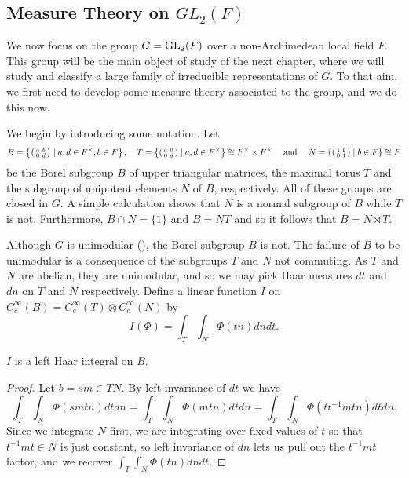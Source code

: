 \subsection{Measure Theory on \texorpdfstring{$GL_2(F)$}{TEXT}}\label{sec:measuregl2}

We now focus on the group $G=\mathrm{GL}_2(F)$ over a non-Archimedean local field $F$. This group will be the main object of study of the next chapter, where we will study and classify a large family of irreducible representations of $G$. To that aim, we first need to develop some measure theory associated to the group, and we do this now.

We begin by introducing some notation. Let $$B=\left\{\begin{psmallmatrix} a&b\\0&d\end{psmallmatrix} \mid a,d \in F^\times, b \in F\right\},\quad T=\left\{\begin{psmallmatrix}
    a&0\\0&d
\end{psmallmatrix}\mid a,d \in F^\times\right\} \cong F^\times \times F^\times\quad\text{ and }\quad N=\left\{\begin{psmallmatrix}
    1&b\\0&1
\end{psmallmatrix}\mid b \in F\right\}\cong F$$ be the Borel subgroup $B$ of upper triangular matrices, the maximal torus $T$ and the subgroup of unipotent elements $N$ of $B$, respectively. All of these groups are closed in $G$. A simple calculation shows that $N$ is a normal subgroup of $B$ while $T$ is not. Furthermore, $B\cap N=\{1\}$ and $B=NT$ and so it follows that $B=N \rtimes T$.

Although $G$ is unimodular (\cite[Proposition 7.5]{BH1}), the Borel subgroup $B$ is not. The failure of $B$ to be unimodular is a consequence of the subgroups $T$ and $N$ not commuting. As $T$ and $N$ are abelian, they are unimodular, and so we may pick Haar measures $dt$ and $dn$ on $T$ and $N$ respectively. Define a linear function $I$ on $C_c^\infty(B) = C_c^\infty(T) \otimes C_c^\infty(N)$ by
$$I(\Phi) = \int_T\int_N \Phi(tn) dn dt.$$

\begin{prop}
    $I$ is a left Haar integral on $B$.
\end{prop}
\begin{proof}
    Let $b=sm \in TN$. By left invariance of $dt$ we have
    $$\int_T\int_N \Phi(smtn)dtdn = \int_T\int_N \Phi(mtn)dtdn = \int_T\int_N \Phi(tt^{-1}mtn)dtdn.$$
    Since we integrate $N$ first, we are integrating over fixed values of $t$ so that $t^{-1}mt \in N$ is just constant, so left invariance of $dn$ lets us pull out the $t^{-1}mt$ factor, and we recover $\int_T\int_N \Phi(tn) dn dt$.
\end{proof}

